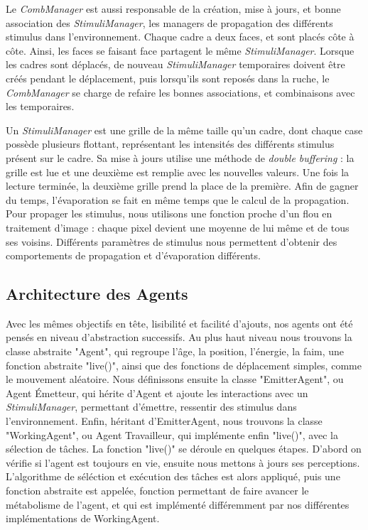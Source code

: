 			Le \textit{CombManager} est aussi responsable de la création, mise à jours, et bonne association des \textit{StimuliManager}, les managers de propagation des différents stimulus dans l'environnement. Chaque cadre a deux faces, et sont placés côte à côte. Ainsi, les faces se faisant face partagent le même \textit{StimuliManager}. Lorsque les cadres sont déplacés, de nouveau \textit{StimuliManager} temporaires doivent être créés pendant le déplacement, puis lorsqu'ils sont reposés dans la ruche, le \textit{CombManager} se charge de refaire les bonnes associations, et combinaisons avec les temporaires.
			
			Un \textit{StimuliManager} est une grille de la même taille qu'un cadre, dont chaque case possède plusieurs flottant, représentant les intensités des différents stimulus présent sur le cadre. Sa mise à jours utilise une méthode de \textit{double buffering} : la grille est lue et une deuxième est remplie avec les nouvelles valeurs. Une fois la lecture terminée, la deuxième grille prend la place de la première. Afin de gagner du temps, l'évaporation se fait en même temps que le calcul de la propagation. Pour propager les stimulus, nous utilisons une fonction proche d'un flou en traitement d'image : chaque pixel devient une moyenne de lui même et de tous ses voisins. Différents paramètres de stimulus nous permettent d'obtenir des comportements de propagation et d'évaporation différents.
			
			\subsection{Architecture des Agents}
			Avec les mêmes objectifs en tête, lisibilité et facilité d'ajouts, nos agents ont été pensés en niveau d'abstraction successifs. Au plus haut niveau nous trouvons la classe abstraite "Agent", qui regroupe l'âge, la position, l'énergie, la faim, une fonction abstraite "live()", ainsi que des fonctions de déplacement simples, comme le mouvement aléatoire. Nous définissons ensuite la classe "EmitterAgent", ou Agent Émetteur, qui hérite d'Agent et ajoute les interactions avec un \textit{StimuliManager}, permettant d'émettre, ressentir des stimulus dans l'environnement. Enfin, héritant d'EmitterAgent, nous trouvons la classe "WorkingAgent", ou Agent Travailleur, qui implémente enfin "live()", avec la sélection de tâches. La fonction "live()" se déroule en quelques étapes. D'abord on vérifie si l'agent est toujours en vie, ensuite nous mettons à jours ses perceptions. L'algorithme de séléction et exécution des tâches est alors appliqué, puis une fonction abstraite est appelée, fonction permettant de faire avancer le métabolisme de l'agent, et qui est implémenté différemment par nos différentes implémentations de WorkingAgent.
			
